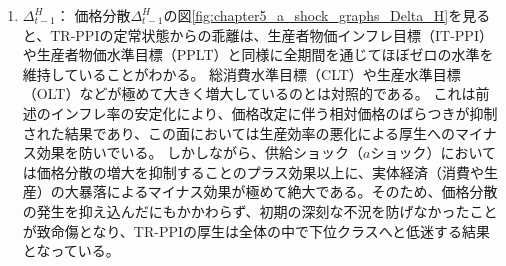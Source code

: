 \begin{enumerate}
        しかし、テイラールールに従って生産者物価の変動に機械的な金融引き締めで対応するため、その後は国内生産財のインフレ率の変動を強く抑制しゼロ近傍に引き戻している。この中盤以降のインフレ率の安定化が次項で述べる価格分散の過度な蓄積を抑える要因となっている一方で、前述した深刻な実体経済の大暴落を招く代償を払っていると言える。
    \item
    \label{itm:chapter5_a_shock_policies_tr_ppi_Delta_t_minus_1_H}
        \(\Delta_{t-1}^H\)：
        価格分散\(\Delta_{t-1}^H\)の図\ref{fig:chapter5_a_shock_graphs_Delta_H}を見ると、TR-PPIの定常状態からの乖離は、生産者物価インフレ目標（IT-PPI）や生産者物価水準目標（PPLT）と同様に全期間を通じてほぼゼロの水準を維持していることがわかる。
        総消費水準目標（CLT）や生産水準目標（OLT）などが極めて大きく増大しているのとは対照的である。
        これは前述のインフレ率の安定化により、価格改定に伴う相対価格のばらつきが抑制された結果であり、この面においては生産効率の悪化による厚生へのマイナス効果を防いでいる。
        しかしながら、供給ショック（\(a\)ショック）においては価格分散の増大を抑制することのプラス効果以上に、実体経済（消費や生産）の大暴落によるマイナス効果が極めて絶大である。そのため、価格分散の発生を抑え込んだにもかかわらず、初期の深刻な不況を防げなかったことが致命傷となり、TR-PPIの厚生は全体の中で下位クラスへと低迷する結果となっている。
\end{enumerate}